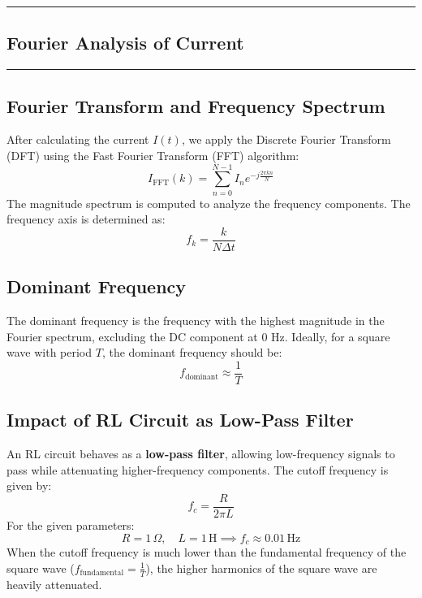 


\newpage
{\color{gray}\hrule}
\begin{center}
\section{Fourier Analysis of Current}
\bigskip
\end{center}
{\color{gray}\hrule}
\begin{multicols}{2}
\subsection{Fourier Transform and Frequency Spectrum}
After calculating the current $I(t)$, we apply the Discrete Fourier Transform (DFT) using the Fast Fourier Transform (FFT) algorithm:
\begin{equation}
I_{\text{FFT}}(k) = \sum_{n=0}^{N-1} I_n e^{-j \frac{2 \pi k n}{N}}
\end{equation}
The magnitude spectrum is computed to analyze the frequency components. The frequency axis is determined as:
\begin{equation}
f_k = \frac{k}{N \Delta t}
\end{equation}
\subsection{Dominant Frequency}
The dominant frequency is the frequency with the highest magnitude in the Fourier spectrum, excluding the DC component at 0 Hz. Ideally, for a square wave with period $T$, the dominant frequency should be:
\begin{equation}
f_{\text{dominant}} \approx \frac{1}{T}
\end{equation}

\subsection{Impact of RL Circuit as Low-Pass Filter}
An RL circuit behaves as a \textbf{low-pass filter}, allowing low-frequency signals to pass while attenuating higher-frequency components. The cutoff frequency is given by:
\begin{equation}
f_c = \frac{R}{2 \pi L}
\end{equation}
For the given parameters:
\begin{equation}
R = 1 \, \Omega, \quad L = 1 \, \text{H} \implies f_c \approx 0.01 \, \text{Hz}
\end{equation}
When the cutoff frequency is much lower than the fundamental frequency of the square wave ($f_{\text{fundamental}} = \frac{1}{T}$), the higher harmonics of the square wave are heavily attenuated. 


\end{multicols}
